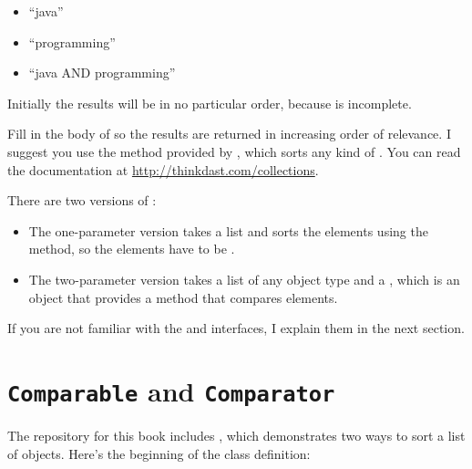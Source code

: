 \documentclass[12pt]{book}
\theoremstyle{exercise}
\begin{document}
\begin{itemize}

\item
  ``java''

\item
  ``programming''

\item
  ``java AND programming''

\end{itemize}

Initially the results will be in no particular order, because
 is incomplete.


Fill in the body of  so the results are returned in
increasing order of relevance. I suggest you use the 
method provided by , which sorts any kind of
. You can read the documentation at
\url{http://thinkdast.com/collections}.

There are two versions of :

\begin{itemize}

\item
  The one-parameter version takes a list and sorts the elements using
  the  method, so the elements have to be
  .

\item
  The two-parameter version takes a list of any object type and a
  , which is an object that provides a
   method that compares elements.

\end{itemize}


If you are not familiar with the  and
 interfaces, I explain them in the next section.


\section{{\tt Comparable} and {\tt Comparator}}
\label{comparable-and-comparator}


The repository for this book includes , which
demonstrates two ways to sort a list of  objects. Here's
the beginning of the class definition:
\end{document}
